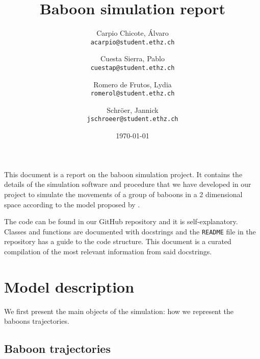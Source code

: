 \documentclass[
    article,
    oneside,
]{memoir}
\begin{document}
\title{Baboon simulation report}
\author{
    Carpio Chicote, Álvaro \\ \texttt{acarpio@student.ethz.ch}
    \and
    Cuesta Sierra, Pablo \\ \texttt{cuestap@student.ethz.ch}
    \and 
    Romero de Frutos, Lydia \\ \texttt{romerol@student.ethz.ch}
    \and Schröer, Jannick \\ \texttt{jschroeer@student.ethz.ch}
}
\date{\today}
\maketitle

This document is a report on the baboon simulation project. It contains the details of the simulation software and procedure that we have developed in our project to simulate the movements of a group of baboons in a 2 dimensional space according to the model proposed by \cite{StrandburgPeshkin2015}.

The code can be found in our GitHub repository \cite{github:baboon-simulation} and it is self-explanatory. Classes and functions are documented with docstrings and the \texttt{README} file in the repository has a guide to the code structure. This document is a curated compilation of the most relevant information from said docstrings.

\tableofcontents*

\chapter{Model description}


We first present the main objects of the simulation: how we represent the baboons trajectories.

\section{Baboon trajectories}
\end{document}
